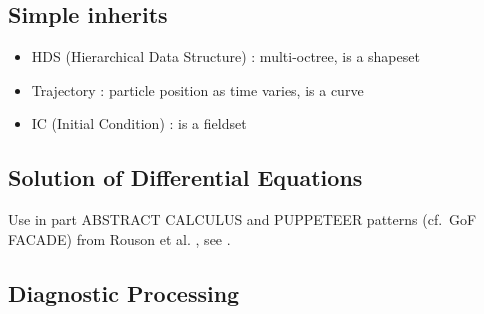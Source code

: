 \subsection{Simple inherits}\label{sec:simple_inherits}

\begin{itemize}
\item
  HDS (Hierarchical Data Structure) : multi-octree, is a shapeset
\item
  Trajectory : particle position as time varies, is a curve
\item
  IC (Initial Condition) : is a fieldset
\end{itemize}

\subsection{Solution of Differential Equations}\label{sec:solution_of_des}

Use in part ABSTRACT CALCULUS and PUPPETEER patterns (cf.~GoF FACADE)
from Rouson et al. \cite{rousonxiaxu}, see .

\subsection{Diagnostic Processing}\label{sec:diagnostic_processing}

